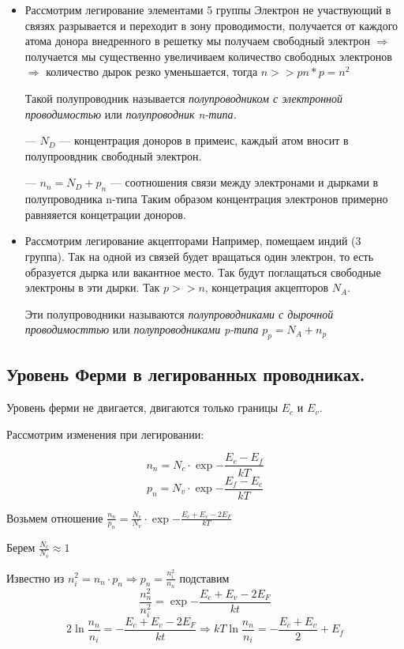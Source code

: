 \documentclass[../main.tex]{subfiles}
\begin{document}
\begin{itemize}
    \item Рассмотрим легирование элементами 5 группы
    Электрон не участвующий в связях разрывается и переходит в зону проводимости, получается от каждого атома донора внедренного в решетку мы получаем свободный электрон $\Rightarrow$ получается мы существенно 
увеличиваем количество свободных электронов $\Rightarrow$ количество дырок резко уменьшается, тогда $n >> p n * p = n^2$ 

 Такой полупроводник называется \textit{полупроводником с электронной проводимостью} или \textit{полупроводник n-типа.}

--- $N_D$ --- концентрация доноров в примеис, каждый атом вносит в полупроовдник свободный электрон.

--- $n_n = N_D +p_n$ --- соотношения связи между электронами и дырками в полупроводника n-типа
 Таким образом концентрация электронов примерно равняяется концетрации доноров.

    \item Рассмотрим легирование акцепторами
    Например, помещаем индий (3 группа).
    Так на одной из связей будет вращаться один электрон, то есть образуется дырка или вакантное место. Так будут поглащаться свободные электроны в эти дырки.
    Так $p >> n$, концетрация акцепторов $N_A$. 
    
 Эти полупроводники называются \textit{полупроводниками с дырочной проводимосттью} или \textit{полупроводниками p-типа} $p_p = N_A + n_p$

\end{itemize}

\subsection{Уровень Ферми в легированных проводниках.}

Уровень ферми не двигается, двигаются только границы $E_c$ и $E_v$.

Рассмотрим изменения при легировании: 

\[ n_n = N_c \cdot \exp{-\frac{E_c - E_f}{kT}} \]
\[ p_n = N_v \cdot \exp{-\frac{E_f - E_c}{kT}} \]

Возьмем отношение $\frac{n_n}{p_n} = \frac{N_c}{N_v} \cdot \exp{- \frac{E_c + E_v - 2E_F}{kT}}$

Берем $\frac{N_c}{N_v} \approx 1$ 

Известно из $n_i^2 = n_n \cdot p_n \Rightarrow p_n = \frac{n_i^2}{n_n}$ подставим 
\[\frac{n_n^2}{n_i^2} = \exp{- \frac{E_c + E_v - 2E_F}{kt}}\]
\[2 \ln{\frac{n_n}{n_i}} = - \frac{E_c + E_v - 2E_F}{kt} \Rightarrow kT \ln{\frac{n_n}{n_i} = - \frac{E_c + E_v}{2} +E_f}\]
\end{document}
